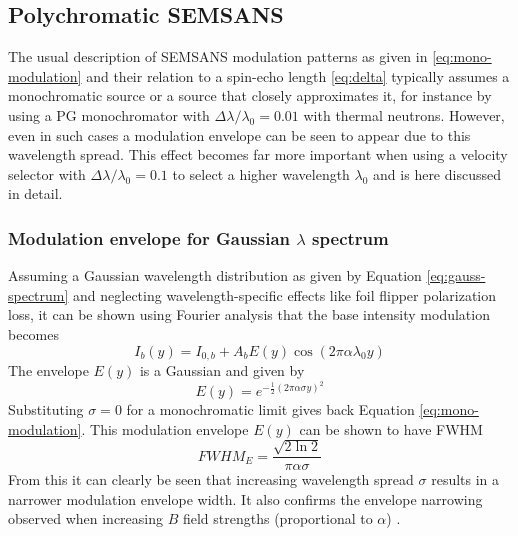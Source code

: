 \documentclass{article}
\begin{document}
\subsection{Polychromatic SEMSANS}
\label{c3.5}
The usual description of SEMSANS modulation patterns as given in \eqref{eq:mono-modulation} and their relation to a spin-echo length \eqref{eq:delta} typically assumes a monochromatic source or a source that closely approximates it, for instance by using a PG monochromator with $\Delta\lambda/\lambda_0 = 0.01$ with thermal neutrons. However, even in such cases a modulation envelope can be seen to appear \cite{bouwman2021} due to this wavelength spread. This effect becomes far more important when using a velocity selector with $\Delta\lambda/\lambda_0 = 0.1$ to select a higher wavelength $\lambda_0$ and is here discussed in detail.
\subsubsection{Modulation envelope for Gaussian $\lambda$ spectrum}
Assuming a Gaussian wavelength distribution as given by Equation \eqref{eq:gauss-spectrum} and neglecting wavelength-specific effects like foil flipper polarization loss, it can be shown using Fourier analysis that the base intensity modulation becomes
\begin{equation}
	I_b(y) = I_{0,b} + A_bE(y)\cos(2\pi\alpha\lambda_0y) \label{eq:poly-base-modulation}
\end{equation}
The envelope $E(y)$ is a Gaussian and given by
\begin{equation}
	E(y) = e^{-\frac{1}{2}\left(2\pi\alpha\sigma y\right)^2} \label{eq:poly-base-modulation-env}
\end{equation}
Substituting $\sigma=0$ for a monochromatic limit gives back Equation \eqref{eq:mono-modulation}. This modulation envelope $E(y)$ can be shown to have FWHM 
\begin{equation}
	FWHM_E = \frac{\sqrt{2\ln 2}}{\pi\alpha\sigma} \label{eq:poly-base-modulation-fwhm}
\end{equation}
From this it can clearly be seen that increasing wavelength spread $\sigma$ results in a narrower modulation envelope width. It also confirms the envelope narrowing observed when increasing $B$ field strengths (proportional to $\alpha$) \cite{bouwman2021}. 
\end{document}

